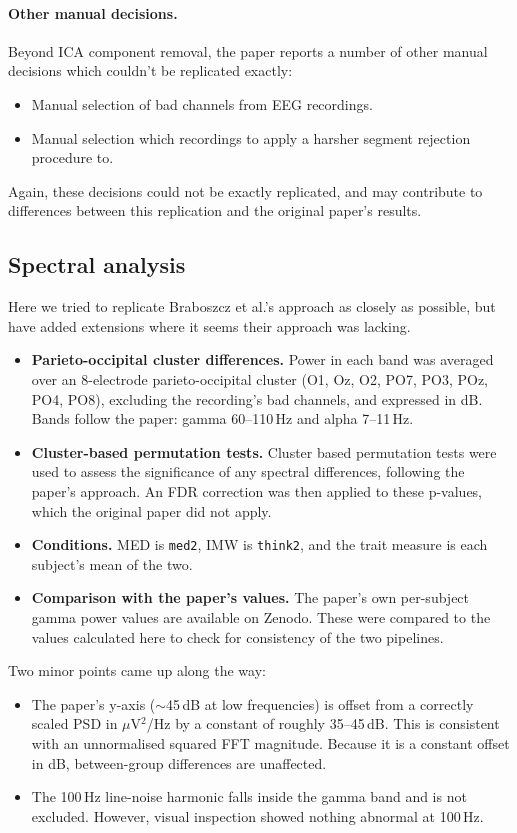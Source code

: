 \documentclass[10pt,a4paper]{article}
\begin{document}
\paragraph{Other manual decisions.} Beyond ICA component removal, the paper reports a number of other manual decisions which couldn't be replicated exactly:
\begin{itemize}
  \item Manual selection of bad channels from EEG recordings.
  \item Manual selection which recordings to apply a harsher segment rejection procedure to.
\end{itemize}
Again, these decisions could not be exactly replicated, and may contribute to differences 
between this replication and the original paper's results.

\subsection{Spectral analysis}
\label{sec:spectral}

Here we tried to replicate Braboszcz et al.'s approach as closely as possible, but have added extensions where
it seems their approach was lacking.

\begin{itemize}
  \item \textbf{Parieto-occipital cluster differences.} Power in each band was averaged over an 8-electrode parieto-occipital cluster
        (O1, Oz, O2, PO7, PO3, POz, PO4, PO8), excluding the recording's bad channels, and expressed in dB.
        Bands follow the paper: gamma 60--110\,Hz and alpha 7--11\,Hz.
  \item \textbf{Cluster-based permutation tests.} Cluster based permutation tests were used to assess the significance of any spectral differences, 
      following the paper's approach. An FDR correction was then applied to these p-values, which the original 
      paper did not apply.
  \item \textbf{Conditions.} MED is \texttt{med2}, IMW is \texttt{think2}, and the trait measure is each subject's
      mean of the two.
  \item \textbf{Comparison with the paper's values.} The paper's own per-subject gamma power values 
      are available on Zenodo. These were compared to the values calculated here to check for consistency
      of the two pipelines.
\end{itemize}
Two minor points came up along the way:
\begin{itemize}
  \item The paper's y-axis ($\sim$45\,dB at low frequencies) is offset from a correctly scaled PSD in
        $\mu$V$^2$/Hz by a constant of roughly 35--45\,dB. This is consistent with an unnormalised squared FFT
        magnitude. Because it is a constant offset in dB, between-group differences are unaffected.
  \item The 100\,Hz line-noise harmonic falls inside the gamma band and is not excluded. However, visual inspection showed
        nothing abnormal at 100\,Hz.
\end{itemize}
\end{document}
